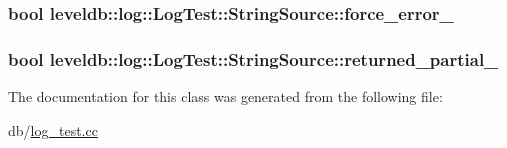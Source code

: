 \subsubsection[{force\+\_\+error\+\_\+}]{\setlength{\rightskip}{0pt plus 5cm}bool leveldb\+::log\+::\+Log\+Test\+::\+String\+Source\+::force\+\_\+error\+\_\+}\label{classleveldb_1_1log_1_1_log_test_1_1_string_source_aac39696e05d613c6123bbae4455c7c27}
\hypertarget{classleveldb_1_1log_1_1_log_test_1_1_string_source_aded237672ac96477565daa85e7c16d71}{}
\subsubsection[{returned\+\_\+partial\+\_\+}]{\setlength{\rightskip}{0pt plus 5cm}bool leveldb\+::log\+::\+Log\+Test\+::\+String\+Source\+::returned\+\_\+partial\+\_\+}\label{classleveldb_1_1log_1_1_log_test_1_1_string_source_aded237672ac96477565daa85e7c16d71}


The documentation for this class was generated from the following file\+:\begin{DoxyCompactItemize}
\item 
db/\hyperlink{log__test_8cc}{log\+\_\+test.\+cc}\end{DoxyCompactItemize}
